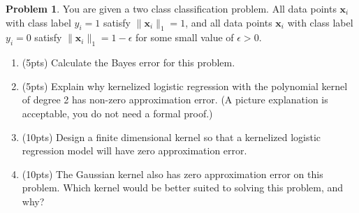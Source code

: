 \documentclass[10pt]{article}
\theoremstyle{definition}
\newtheorem{problem}{Problem}
\newcommand{\x}{\mathbf x}
\begin{document}
\begin{problem}
    You are given a two class classification problem.
    All data points $\x_i$ with class label $y_i=1$ satisfy $\lVert\x_i\lVert_1 = 1$,
    and all data points $\x_i$ with class label $y_i=0$ satisfy $\lVert\x_i\lVert_1 = 1-\epsilon$ for some small value of $\epsilon>0$.
    \begin{enumerate}
        \item (5pts) Calculate the Bayes error for this problem.
            \vspace{1in}
        \item (5pts) Explain why kernelized logistic regression with the polynomial kernel of degree 2 has non-zero approximation error.
            (A picture explanation is acceptable, you do not need a formal proof.)
            \vspace{2in}
        \item (10pts) Design a finite dimensional kernel so that a kernelized logistic regression model will have zero approximation error.
            \vspace{2in}
        \item (10pts) The Gaussian kernel also has zero approximation error on this problem.  Which kernel would be better suited to solving this problem, and why?
    \end{enumerate}
\end{problem}
\end{document}

